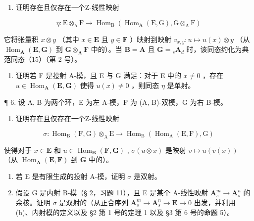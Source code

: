 \begin{enumerate}
\def\labelenumi{(\alph{enumi})}
\tightlist
\item
  证明存在且仅存在一个Z-线性映射
\end{enumerate}

\[
\eta : \mathrm{E} \otimes_ {\mathrm{A}} \mathrm{F} \rightarrow \operatorname{Hom} _ {\mathrm{B}} (\operatorname{Hom} _ {\mathrm{A}} (\mathrm{E}, \mathrm{G}), \mathrm{G} \otimes_ {\mathrm{A}} \mathrm{F})
\]

它将张量积 \(x \otimes y\) （其中 \(x \in \mathbf{E}\) 且 \(y \in \mathbf{F}\) ）映射到映射 \(v_{x,y}: u \mapsto u(x) \otimes y\) （从 \(\operatorname{Hom}_{\mathbf{A}}(\mathbf{E}, \mathbf{G})\) 到 \(\mathbf{G} \otimes_{\mathbf{A}} \mathbf{F}\) 中的）。当 \(\mathbf{B} = \mathbf{A}\) 且 \(\mathbf{G} = {}_s\mathbf{A}_d\) 时，该同态约化为典范同态（15）（第 2 号）。

\begin{enumerate}
\def\labelenumi{(\alph{enumi})}
\setcounter{enumi}{1}
\tightlist
\item
  证明若 F 是投射 A-模，且 E 与 G 满足：对于 E 中的 \(x \neq 0\) ，存在 \(u \in \operatorname{Hom}_{\mathbf{A}}(\mathbf{E}, \mathbf{G})\) 使得 \(u(x) \neq 0\) ，则同态 \(\eta\) 是单射。
\end{enumerate}

¶ 6. 设 A, B 为两个环，E 为左 A-模，F 为 (A, B)-双模，G 为右 B-模。

\begin{enumerate}
\def\labelenumi{(\alph{enumi})}
\tightlist
\item
  证明存在且仅存在一个Z-线性映射
\end{enumerate}

\[
\sigma : \operatorname{Hom} _ {\mathrm{B}} (\mathrm{F}, \mathrm{G}) \otimes_ {\mathrm{A}} \mathrm{E} \rightarrow \operatorname{Hom} _ {\mathrm{B}} (\operatorname{Hom} _ {\mathrm{A}} (\mathrm{E}, \mathrm{F}), \mathrm{G})
\]

使得对于 \(x \in \mathbf{E}\) 和 \(u \in \operatorname{Hom}_{\mathbf{B}}(\mathbf{F}, \mathbf{G})\) , \(\sigma(u \otimes x)\) 是映射 \(v \mapsto u(v(x))\) （从 \(\operatorname{Hom}_{\mathbf{A}}(\mathbf{E}, \mathbf{F})\) 到 \(\mathbf{G}\) 中的）。

\begin{enumerate}
\def\labelenumi{(\alph{enumi})}
\setcounter{enumi}{1}
\item
  若 E 是有限生成的投射 A-模，证明 \(\sigma\) 是双射。
\item
  假设 G 是内射 B-模（§ 2，习题 11），且 E 是某个 A-线性映射 \(\mathbf{A}_s^m \to \mathbf{A}_s^n\) 的余核。证明 \(\sigma\) 是双射的（从正合序列 \(\mathbf{A}_s^m \to \mathbf{A}_s^n \to \mathbf{E} \to 0\) 出发，并利用 (b)、内射模的定义以及 §2 第 1 号的定理 1 以及 §3 第 6 号的命题 5）。
\end{enumerate}

